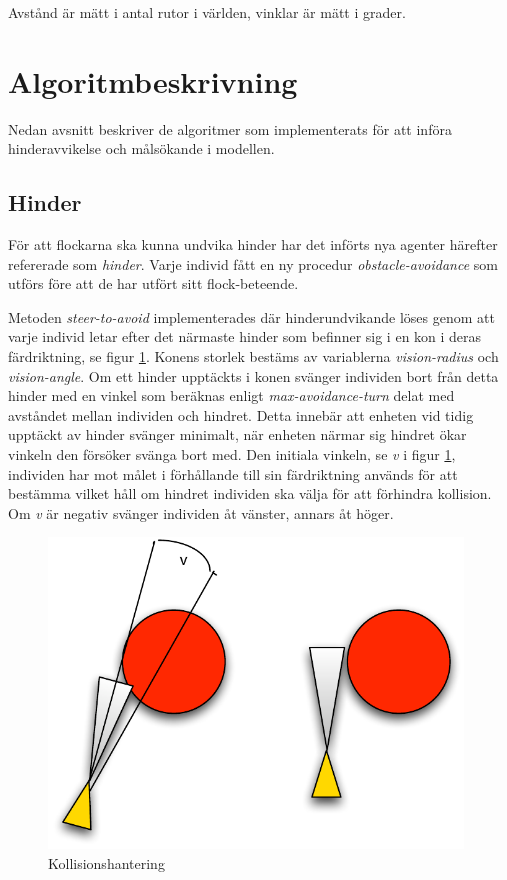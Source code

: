 \documentclass[titlepage, a4paper, 12pt]{article}
\begin{document}
Avstånd är mätt i antal rutor i världen, vinklar är mätt i grader.

\section{Algoritmbeskrivning}
Nedan avsnitt beskriver de algoritmer som implementerats för att
införa hinderavvikelse och målsökande i modellen.

\subsection{Hinder}\label{algo:hinder}
För att flockarna ska kunna undvika hinder har det införts nya agenter
härefter refererade som \textit{hinder}. Varje individ fått en ny
procedur \textit{obstacle-avoidance} som utförs före att de har utfört
sitt flock-beteende.

Metoden \textit{steer-to-avoid} implementerades där hinderundvikande
löses genom att varje individ letar efter det närmaste hinder som
befinner sig i en kon i deras färdriktning, se figur
\ref{fig:collision}. Konens storlek bestäms av variablerna
\textit{vision-radius} och \textit{vision-angle}. Om ett hinder
upptäckts i konen svänger individen bort från detta hinder med en
vinkel som beräknas enligt \textit{max-avoidance-turn} delat med
avståndet mellan individen och hindret. Detta innebär att enheten vid
tidig upptäckt av hinder svänger minimalt, när enheten närmar sig
hindret ökar vinkeln den försöker svänga bort med. Den initiala
vinkeln, se \textit{v} i figur \ref{fig:collision}, individen har mot
målet i förhållande till sin färdriktning används för att bestämma
vilket håll om hindret individen ska välja för att förhindra
kollision. Om \textit{v} är negativ svänger individen åt vänster,
annars åt höger.

\begin{figure}[H]
  \begin{center}
    \includegraphics[width=110mm]{images/collision.pdf}
    \caption{Kollisionshantering}
    \label{fig:collision}
  \end{center}
\end{figure}
\end{document}
